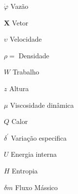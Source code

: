 \documentclass[
	10pt,				%
	openright,			%
	twoside,			%
	a4paper,			%
	chapter=TITLE,		%
	section=TITLE,		%
	subsection=TITLE,	%
	subsubsection=TITLE,%
	english,			%
	french,				%
	brazil,				%
	sumario=tradicional
]{abntex2}
\begin{document}

\frenchspacing

\imprimircapa

\imprimirfolhaderosto*

\tableofcontents*

\begin{simbolos}
    \item[\(\dot{\varphi } \)]   Vazão
    \item[\(\mathbf{X} \) ]     Vetor
    \item [\(\upsilon \) ]   Velocidade
    \item [\(\rho = \) ]    Densidade
    \item [\(W\)]   Trabalho
    \item [\(z\)]   Altura
    \item [\(\mu \) ] Viscosidade dinâmica
    \item [\(Q \) ]  Calor
    \item [\(\delta ^\prime\) ]  Variação especifica
    \item [\(U\) ]  Energia interna
    \item [\(H\) ]  Entropia
    \item [\(\delta m\) ]    Fluxo Mássico
\end{simbolos}


% 
% 
% 
% 

% 
% 
\end{document}
